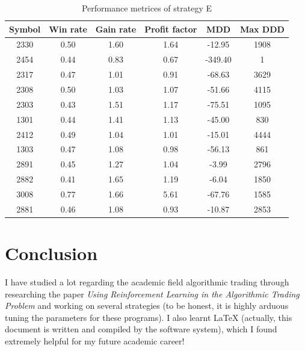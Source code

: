 \documentclass[12pt, letterpaper, oneside]{article}
\begin{document}
\begin{table}[h!]
    \centering
    \begin{tabular}{ |c|c|c|c|c|c| }
        \hline
        Symbol & Win rate & Gain rate & Profit factor & MDD & Max DDD \\ [0.5ex]
        \hline
        2330 & 0.50 & 1.60 & 1.64 & -12.95 & 1908 \\
        2454 & 0.44 & 0.83 & 0.67 & -349.40 & 1 \\
        2317 & 0.47 & 1.01 & 0.91 & -68.63 & 3629 \\
        2308 & 0.50 & 1.03 & 1.07 & -51.66 & 4115 \\
        2303 & 0.43 & 1.51 & 1.17 & -75.51 & 1095 \\
        1301 & 0.44 & 1.41 & 1.13 & -45.00 & 830 \\
        2412 & 0.49 & 1.04 & 1.01 & -15.01 & 4444 \\
        1303 & 0.47 & 1.08 & 0.98 & -56.13 & 861 \\
        2891 & 0.45 & 1.27 & 1.04 & -3.99 & 2796 \\
        2882 & 0.41 & 1.65 & 1.19 & -6.04 & 1850 \\
        3008 & 0.77 & 1.66 & 5.61 & -67.76 & 1585 \\
        2881 & 0.46 & 1.08 & 0.93 & -10.87 & 2853 \\ [0.5ex]
        \hline
    \end{tabular}
    \caption{Performance metrices of strategy E}
    \label{table:e}
\end{table}

\section{Conclusion}
I have studied a lot regarding the academic field algorithmic trading through researching the paper \textit{Using Reinforcement Learning in the Algorithmic Trading Problem} and working on several strategies (to be honest, it is highly arduous tuning the parameters for these programs). I also learnt \LaTeX{} (actually, this document is written and compiled by the software system), which I found extremely helpful for my future academic career!

\medskip



\end{document}
